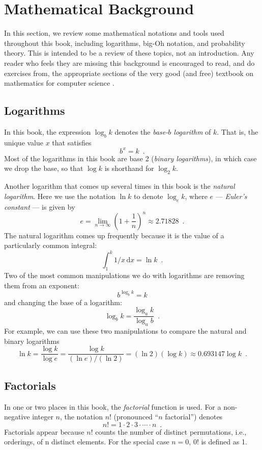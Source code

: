 \section{Mathematical Background}

In this section, we review some mathematical notations and tools
used throughout this book, including logarithms, big-Oh notation, and
probability theory.  This is intended to be a review of these topics, not
an introduction.  Any reader who feels they are missing this background
is encouraged to read, and do exercises from, the appropriate sections
of the very good (and free) textbook on mathematics for computer science
\cite{llm11}.

\subsection{Logarithms}

In this book, the expression $\log_b k$ denotes the \emph{base-$b$ logarithm}
of $k$.  That is, the unique value $x$ that satisfies
\[
    b^{x} = k  \enspace .
\]
Most of the logarithms in this book are base 2 (\emph{binary logarithms}),
in which case we drop the base, so that $\log k$ is shorthand for
$\log_2 k$.

Another logarithm that comes up several times in this book is the
\emph{natural logarithm}.  Here we use the notation $\ln k$ to denote
$\log_e k$, where $e$ --- \emph{Euler's constant} --- is given by
\[
   e = \lim_{n\rightarrow\infty} \left(1+\frac{1}{n}\right)^n
   \approx  2.71828 \enspace .
\]
The natural logarithm comes up frequently because it is the value
of a particularly common integral:
\[
    \int_{1}^{k} 1/x\,\mathrm{d}x  = \ln k \enspace .
\]
Two of the most common manipulations we do with logarithms are removing
them from an exponent:
\[
    b^{\log_b k} = k
\]
and changing the base of a logarithm:
\[
    \log_b k = \frac{\log_a k}{\log_a b} \enspace .
\]
For example, we can use these two manipulations to compare the natural and binary logarithms
\[
   \ln k = \frac{\log k}{\log e} = \frac{\log k}{(\ln e)/(\ln 2)} = 
    (\ln 2)(\log k) \approx 0.693147\log k \enspace .
\]

\subsection{Factorials}

In one or two places in this book, the \emph{factorial} function is used.
For a non-negative integer $n$, the notation $n!$ (pronounced ``$n$ factorial'') denotes
\[
   n! = 1\cdot2\cdot3\cdot\cdots\cdot n \enspace .
\]
Factorials appear because $n!$ counts the number of distinct
permutations, i.e., orderings, of n distinct elements.  For the special case $n=0$, $0!$ is defined as 1. 

